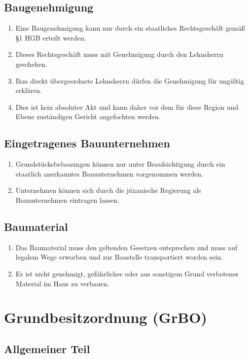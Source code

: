 \documentclass{article}
\begin{document}
\subsection{Baugenehmigung} \label{baugen}
\begin{enumerate}[(1)]
    \item Eine Baugenehmigung kann nur durch ein staatliches Rechtsgeschäft gemäß §1 HGB erteilt werden.
    \item Dieses Rechtsgeschäft muss mit Genehmigung durch den Lehnsherrn geschehen.
    \item Ihm direkt übergeordnete Lehnsherrn dürfen die Genehmigung für ungültig erklären.
    \item Dies ist kein absoluter Akt und kann daher vor dem für diese Region und Ebene zuständigen Gericht angefochten werden.
\end{enumerate}

\subsection{Eingetragenes Bauunternehmen} \label{bauunt}
\begin{enumerate}[(1)]
    \item Grundstücksbebauungen können nur unter Beaufsichtigung durch ein staatlich anerkanntes Bauunternehmen vorgenommen werden.
    \item Unternehmen können sich durch die júxanische Regierung als Bauunternehmen eintragen lassen.
\end{enumerate}

\subsection{Baumaterial}
\begin{enumerate}[(1)]
    \item Das Baumaterial muss den geltenden Gesetzen entsprechen und muss auf legalem Wege erworben und zur Baustelle transportiert worden sein.
    \item Es ist nicht genehmigt, gefährliches oder aus sonstigem Grund verbotenes Material im Haus zu verbauen.
\end{enumerate}

\section{Grundbesitzordnung (GrBO)}
\localtableofcontents
\subsection{Allgemeiner Teil}
\end{document}
